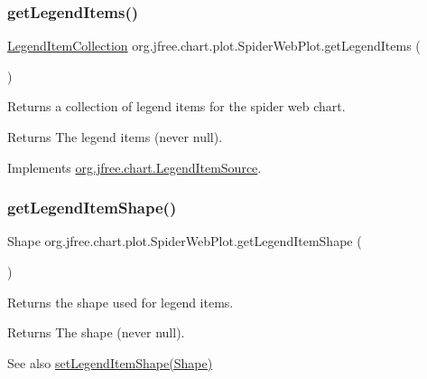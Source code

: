 \subsubsection{\texorpdfstring{get\+Legend\+Items()}{getLegendItems()}}
{\footnotesize\ttfamily \mbox{\hyperlink{classorg_1_1jfree_1_1chart_1_1_legend_item_collection}{Legend\+Item\+Collection}} org.\+jfree.\+chart.\+plot.\+Spider\+Web\+Plot.\+get\+Legend\+Items (\begin{DoxyParamCaption}{ }\end{DoxyParamCaption})}

Returns a collection of legend items for the spider web chart.

\begin{DoxyReturn}{Returns}
The legend items (never {\ttfamily null}). 
\end{DoxyReturn}


Implements \mbox{\hyperlink{interfaceorg_1_1jfree_1_1chart_1_1_legend_item_source_a224409463c4f7a8ef0e2a9df337e6d3b}{org.\+jfree.\+chart.\+Legend\+Item\+Source}}.

\mbox{\label{classorg_1_1jfree_1_1chart_1_1plot_1_1_spider_web_plot_af1384896a267b06d1f0265ee0a34f484}} 
\subsubsection{\texorpdfstring{get\+Legend\+Item\+Shape()}{getLegendItemShape()}}
{\footnotesize\ttfamily Shape org.\+jfree.\+chart.\+plot.\+Spider\+Web\+Plot.\+get\+Legend\+Item\+Shape (\begin{DoxyParamCaption}{ }\end{DoxyParamCaption})}

Returns the shape used for legend items.

\begin{DoxyReturn}{Returns}
The shape (never {\ttfamily null}).
\end{DoxyReturn}
\begin{DoxySeeAlso}{See also}
\mbox{\hyperlink{classorg_1_1jfree_1_1chart_1_1plot_1_1_spider_web_plot_a0e62740eed3460f77015809f41fdfaea}{set\+Legend\+Item\+Shape(\+Shape)}} 
\end{DoxySeeAlso}
\mbox{\label{classorg_1_1jfree_1_1chart_1_1plot_1_1_spider_web_plot_a696dc91dc7888409aa37f59e795e95d7}} 
